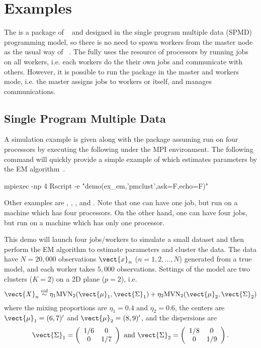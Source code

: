 \section[Examples]{Examples}
\label{sec:example}

The  is a package of ~\citep{Rcore} and
designed in the single program multiple data (SPMD)
programming model, so there is no need to spawn workers from the master node
as the usual way of ~\citep{Yu2010}.
The  fully uses the resource
of processors by running jobs on all workers,
i.e. each workers do the their own jobs and communicate with others.
However, it is possible to run the package in the master and workers mode,
i.e. the master assigns jobs to workers or itself, and manages communications.


\subsection[Single Program Multiple Data]{Single Program Multiple Data}
\label{sec:spmd}

A simulation example is given along with the  package
assuming run on four processors by executing the following under the
MPI environment.
The following command will quickly provide a simple example of 
which estimates parameters by the EM algorithm~\citep{Dempster1977}.
\begin{Command}
mpiexec -np 4 Rscript -e "demo(ex_em,'pmclust',ask=F,echo=F)"
\end{Command}
Other examples are , , , and
.
Note that one can have one job, but run on a machine which has four processors.
On the other hand, one can have four jobs, but run on a machine which has only
one processor.

This demo will launch four jobs/workers to simulate a small dataset and then
perform the EM algorithm to estimate parameters and cluster the data.
The data have $N = 20,000$ observations $\vect{x}_n$ ($n = 1, 2, \ldots, N$)
generated from a true model, and each worker takes $5,000$ observations.
Settings of the model are two clusters ($K = 2$)
on a 2D plane ($p = 2$), i.e.
$$
\vect{X}_n \overset{iid}{\sim}
\eta_1 \mbox{MVN}_2(\vect{\mu}_1, \vect{\Sigma}_1) +
\eta_2 \mbox{MVN}_2(\vect{\mu}_2, \vect{\Sigma}_2)
$$
where the mixing proportions are
$\eta_1 = 0.4$ and $\eta_2 = 0.6$, the centers are
$\vect{\mu}_1 = (6, 7)^\prime$ and $\vect{\mu}_2 = (8, 9)^\prime$,
and the dispersions are
$$
\vect{\Sigma}_1 =
\left(
\begin{array}{cc}
1/6 & 0 \\
0   & 1/7 \\
\end{array}
\right)
\mbox{ and }
\vect{\Sigma}_2 =
\left(
\begin{array}{cc}
1/8 & 0 \\
0   & 1/9 \\
\end{array}
\right).
$$

